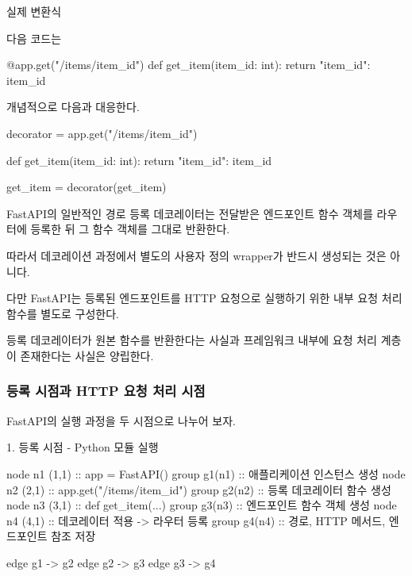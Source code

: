 \begin{dhknote}
\begin{dhksmry}[centered]
실제 변환식
\end{dhksmry}
\end{dhknote}

다음 코드는

\begin{dhkcode}
@app.get("/items/{item_id}")
def get_item(item_id: int):
    return {"item_id": item_id}
\end{dhkcode}

개념적으로 다음과 대응한다.

\begin{dhkcode}
decorator = app.get("/items/{item_id}")


def get_item(item_id: int):
    return {"item_id": item_id}


get_item = decorator(get_item)
\end{dhkcode}

FastAPI의 일반적인 경로 등록 데코레이터는 전달받은 엔드포인트 함수 객체를 라우터에 등록한 뒤 그 함수 객체를 그대로 반환한다.

따라서 데코레이션 과정에서 별도의 사용자 정의 wrapper가 반드시 생성되는 것은 아니다.

다만 FastAPI는 등록된 엔드포인트를 HTTP 요청으로 실행하기 위한 내부 요청 처리 함수를 별도로 구성한다.

등록 데코레이터가 원본 함수를 반환한다는 사실과 프레임워크 내부에 요청 처리 계층이 존재한다는 사실은 양립한다.

\subsubsection{등록 시점과 HTTP 요청 처리 시점}

FastAPI의 실행 과정을 두 시점으로 나누어 보자.

\begin{dhknote}
\begin{dhksmry}[centered]
1. 등록 시점 - Python 모듈 실행
\end{dhksmry}
\end{dhknote}

\begin{dhkgraph}[uniform]
node n1 (1,1) :: app = FastAPI()
group g1(n1) :: 애플리케이션 인스턴스 생성
node n2 (2,1) :: app.get("/items/{item_id}")
group g2(n2) :: 등록 데코레이터 함수 생성
node n3 (3,1) :: def get_item(...)
group g3(n3) :: 엔드포인트 함수 객체 생성
node n4 (4,1) :: 데코레이터 적용 -> 라우터 등록
group g4(n4) :: 경로, HTTP 메서드, 엔드포인트 참조 저장

edge g1 -> g2
edge g2 -> g3
edge g3 -> g4
\end{dhkgraph}

